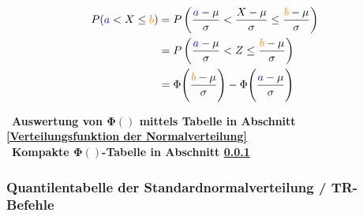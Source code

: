 
\vspace{-0.4cm}

\begin{align*}
	P({\color{blue}a} < X \leq {\color{orange}b})	&= P \left( \frac{{\color{blue}a} - \mu}{\sigma} < \frac{X - \mu}{\sigma} \leq \frac{{\color{orange}b} - \mu}{\sigma}  \right) 	\\
								&= P \left( \frac{{\color{blue}a} - \mu}{\sigma}  < Z \leq \frac{{\color{orange}b} - \mu}{\sigma} \right) 						\\
								&= \Phi \Bigg( \frac{{\color{orange}b} - \mu}{\sigma} \Bigg) -  \Phi \Bigg( \frac{{\color{blue}a} - \mu}{\sigma} \Bigg)
\end{align*}

\textrightarrow\ \textbf{Auswertung von $\bm{\Phi()}$ mittels Tabelle in Abschnitt \ref{Verteilungsfunktion der Normalverteilung} } \\
\textrightarrow\ \textbf{Kompakte $\bm{\Phi()}$-Tabelle in Abschnitt \ref{Quantilentabelle der Standardnormalverteilung} } 


\subsubsection{Quantilentabelle der Standardnormalverteilung / TR-Befehle}
\label{Quantilentabelle der Standardnormalverteilung}

